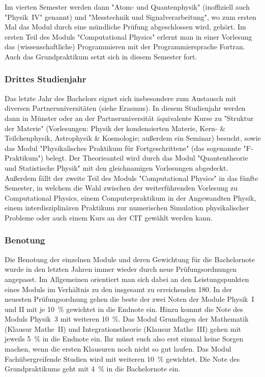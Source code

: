 \begin{multicols}{2}
Im vierten Semester werden dann "Atom- und Quantenphysik" (inoffiziell auch "Physik~IV" genannt) und "Messtechnik und Signalverarbeitung", wo zum ersten Mal das Modul durch eine mündliche Prüfung abgeschlossen wird, gehört.
Im ersten Teil des Moduls "Computational Physics" erlernt man in einer Vorlesung das (wissenschaftliche) Programmieren mit der Programmiersprache Fortran.
Auch das Grundpraktikum setzt sich in diesem Semester fort.

\subsubsection{Drittes Studienjahr}
Das letzte Jahr des Bachelors eignet sich insbesondere zum Austausch mit diversen Partneruniversitäten (siehe Erasmus).
In diesem Studienjahr werden dann in Münster oder an der Partneruniversität äquivalente Kurse zu "Struktur der Materie" (Vorlesungen: Physik der kondensierten Materie, Kern- \& Teilchenphysik, Astrophysik \& Kosmologie; außerdem ein Seminar) besucht, sowie das Modul "Physikalisches Praktikum für Fortgeschrittene" (das sogenannte "F-Praktikum") belegt.
Der Theorieanteil wird durch das Modul "Quantentheorie und Statistische Physik" mit den gleichnamigen Vorlesungen abgedeckt.
Außerdem fällt der zweite Teil des Moduls "Computational Physics" in das fünfte Semester, in welchem die Wahl zwischen der weiterführenden Vorlesung zu Computational Physics, einem Computerpraktikum in der Angewandten Physik, einem interdisziplinären Praktikum zur numerischen Simulation physikalischer Probleme oder auch einem Kurs an der CIT gewählt werden kann.

\subsubsection{Benotung}
Die Benotung der einzelnen Module und deren Gewichtung für die Bachelornote wurde in den letzten Jahren immer wieder durch neue Prüfungsordnungen angepasst.
Im Allgemeinen orientiert man sich dabei an den Leistungspunkten eines Moduls im Verhältnis zu den insgesamt zu erreichenden \SI{180}{\LP}.
In der neuesten Prüfungsordnung gehen die beste der zwei Noten der Module Physik~I und II mit je \SI{10}{\percent} gewichtet in die Endnote ein. Hinzu kommt die Note des Moduls Physik~3 mit weiteren \SI{10}{\percent}.
Das Modul Grundlagen der Mathematik (Klausur Mathe~II) und Integrationstheorie (Klausur Mathe~III) gehen mit jeweils \SI{5}{\percent} in die Endnote ein.
Ihr müsst euch also erst einmal keine Sorgen machen, wenn die ersten Klausuren noch nicht so gut laufen.
Das Modul Fachübergreifende Studien wird mit weiteren \SI{10}{\percent} gewichtet.
Die Note des Grundpraktikums geht mit \SI{4}{\percent} in die Bachelornote ein.


\end{multicols}
